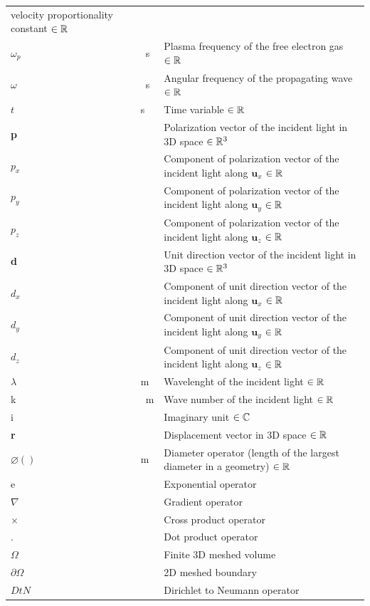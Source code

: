 \documentclass[12pt]{article}
\begin{document}
\begin{longtable*}{l l p{12cm}}
		velocity proportionality constant $\in \Bbb R$ \\ $\omega_p$ & \si{\per \second}
		& Plasma frequency of the free electron gas $\in \Bbb R$ \\ $\omega$ & \si{\per
			\second} & Angular frequency of the propagating wave $\in \Bbb R$ \\ $t$ &
		\si{\second} & Time variable $\in \Bbb R$ \\ \textbf{p} &  & Polarization vector
		of the incident light in 3D space $\in \Bbb R^3$ \\ $p_x$ &  & Component of
		polarization vector of the incident light along $\textbf{u}_x$ $\in \Bbb R$ \\
		$p_y$ &  & Component of polarization vector of the incident light along
		$\textbf{u}_y$ $\in \Bbb R$ \\ $p_z$ &  & Component of polarization vector of
		the incident light along $\textbf{u}_z$ $\in \Bbb R$ \\ \textbf{d} & & Unit
		direction vector of the incident light in 3D space $\in \Bbb R^3$ \\ $d_x$ & &
		Component of unit direction vector of the incident light along $\textbf{u}_x$
		$\in \Bbb R$ \\ $d_y$ & & Component of unit direction vector of the incident
		light along $\textbf{u}_y$ $\in \Bbb R$ \\ $d_z$ & & Component of unit direction
		vector of the incident light along $\textbf{u}_z$ $\in \Bbb R$ \\ $\lambda$ &
		\si{\meter} & Wavelenght of the incident light $\in \Bbb R$ \\ k & \si{\per
			\meter} & Wave number of the incident light $\in \Bbb R$ \\ i & & Imaginary unit
		$\in \Bbb C$ \\ \textbf{r} &  & Displacement vector in 3D space $\in \Bbb R$ \\
		$\varnothing()$ & \si{\meter} & Diameter operator (length of the largest
		diameter in a geometry) $\in \Bbb R$ \\ e & & Exponential operator \\ $\nabla$ &
		& Gradient operator \\ $\times$ & & Cross product operator \\ $\textbf{.}$ & &
		Dot product operator \\ $\Omega$ & & Finite 3D meshed volume \\ $\partial
		\Omega$ & & 2D meshed boundary \\ $DtN$ & & Dirichlet to Neumann operator \\
		\bottomrule \end{longtable*}
	
\end{document}
